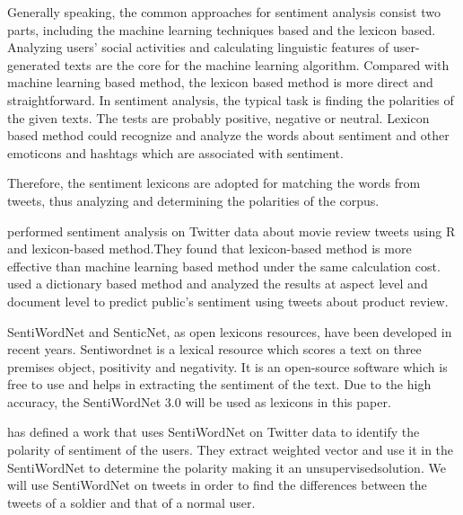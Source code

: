 Generally speaking, the common approaches for sentiment analysis consist two parts, including the machine learning techniques based and the lexicon based. Analyzing users’ social activities and calculating linguistic features of user-generated texts are the core for the machine learning algorithm. Compared with machine learning based method, the lexicon based method is more direct and straightforward. In sentiment analysis, the typical task is finding the polarities of the given texts. The tests are probably positive, negative or neutral. Lexicon based method could recognize and analyze the words about sentiment and other emoticons and hashtags which are associated with sentiment.

Therefore, the sentiment lexicons are adopted for matching the words from tweets, thus analyzing and determining the polarities of the corpus.

\cite{azizan2019lexicon} performed sentiment analysis on Twitter data about movie review tweets using R and lexicon-based method.They found that lexicon-based method is more effective than machine learning based method under the same calculation cost. \cite{8073512} used a dictionary based method and analyzed the results at aspect level and document level to predict public’s sentiment using tweets about product review.

SentiWordNet and SenticNet, as open lexicons resources, have been developed in recent years. Sentiwordnet is a lexical resource which scores a text on three premises object, positivity and negativity. It is an open-source software which is free to use and helps in extracting the sentiment of the text. Due to the high accuracy, the SentiWordNet 3.0 \citep{baccianella2010sentiwordnet} will be used as lexicons in this paper.

\cite{montejo2012random} has defined a work that uses SentiWordNet on Twitter data to identify the polarity of sentiment of the users. They extract weighted vector and use it in the SentiWordNet to determine the polarity making it an unsupervisedsolution. We will use SentiWordNet on tweets in order to find the differences between the tweets of a soldier and that of a normal user.
